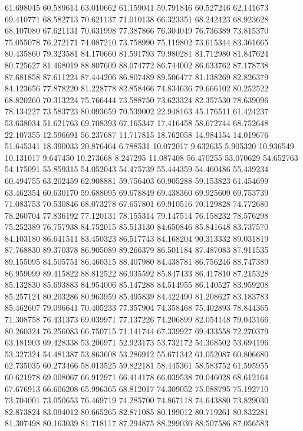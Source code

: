 61.698045
60.589614
63.010662
61.159041
59.791846
60.527246
62.141673
69.410771
68.582713
70.621137
71.010138
66.323351
68.242423
68.923628
68.107080
67.621131
70.631998
77.387866
76.304049
76.736389
73.815370
75.055078
76.272171
74.087210
73.758990
75.119802
73.615344
83.361665
80.435860
79.323581
84.170660
81.591793
79.980281
81.712980
81.847624
80.725627
81.468019
88.807609
88.074772
86.744002
86.633762
87.178738
87.681858
87.611224
87.444206
86.807489
89.506477
81.138269
82.826379
84.123656
77.878220
81.228778
82.858466
74.834636
79.666102
80.252522
68.820260
70.313224
75.766444
73.588750
73.623324
82.357530
78.639096
78.134227
73.583723
80.093659
70.539002
22.948163
45.176511
61.424237
53.638034
51.621763
69.708393
67.165347
17.416458
58.672744
68.752648
22.107355
12.596691
56.237687
11.717815
18.762058
14.984154
14.019676
51.645341
18.390033
20.876464
6.788531
10.072017
9.632635
5.905320
10.936549
10.131017
9.647450
10.273668
8.247295
11.087408
56.470255
53.070629
54.652763
54.175091
55.859315
54.052043
54.475739
55.444359
54.460486
55.439234
60.494755
63.202459
62.908881
59.756403
60.905288
59.153823
61.454699
63.462354
60.630170
59.688095
69.678849
69.438360
69.925609
69.753739
71.083753
70.530846
68.073278
67.657801
69.910516
70.129828
74.772680
78.260704
77.836192
77.120131
78.155314
79.147514
76.158232
78.576298
75.252389
76.757938
84.752015
85.513130
84.650846
85.841648
83.737570
84.103180
86.641511
83.450323
86.517743
84.168204
90.313332
89.031819
87.768830
89.370378
86.905089
89.266379
86.501184
87.487083
87.911535
89.155095
84.505751
86.460315
88.407980
84.438781
86.756246
88.747389
86.959099
89.415822
88.812522
86.935592
85.847433
86.417810
87.215328
85.132830
85.693883
84.954006
85.147288
84.514955
86.140527
83.959208
85.257124
80.203286
80.963959
85.495839
84.422490
81.208627
83.183783
85.462607
79.096641
70.405233
77.357904
74.358468
75.402893
78.844365
71.308758
76.431373
69.039971
77.137226
74.206899
82.054148
79.043166
80.260324
76.256083
66.750715
71.141744
67.339927
69.433558
72.270379
63.181903
69.428338
53.206971
52.923173
53.732172
54.368502
53.694196
53.327324
54.481387
53.863608
53.286912
55.671342
61.052087
60.806680
62.735035
60.273466
58.013525
59.822181
58.445361
58.583752
61.595955
60.621978
69.008067
66.912971
66.414178
66.039538
70.046028
68.612164
67.676913
66.606208
65.996365
68.812017
74.309052
75.088795
75.192710
73.704001
73.050653
76.469719
74.285700
74.867118
74.643880
73.829030
82.873824
83.094012
80.665265
82.871085
80.199012
80.719261
80.832281
81.307498
80.163039
81.718117
87.294875
88.299036
88.507586
87.056583
